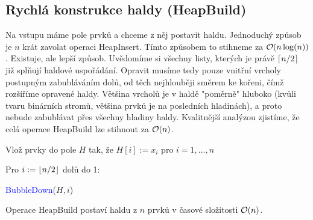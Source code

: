 \begin{center}
    
\end{center}

\bigskip

\subsection{Rychlá konstrukce haldy (HeapBuild)}

Na vstupu máme pole prvků a chceme z něj postavit haldu. Jednoduchý způsob je $n$ krát zavolat operaci HeapInsert. Tímto způsobem to stihneme za $\mathcal{O}(n\log(n))$. Existuje, ale lepší způsob. Uvědomíme si všechny listy, kterých je právě $\left\lceil n/2\right\rceil$ již splňují haldové uspořádání. Opravit musíme tedy pouze vnitřní vrcholy postupným zabubláváním dolů, od těch nejhlouběji směrem ke kořeni, čímž rozšíříme opravené haldy. Většina vrcholů je v haldě "poměrně" hluboko (kvůli tvaru binárních stromů, většina prvků je na posledních hladinách), a proto nebude zabublávat přes všechny hladiny haldy. Kvalitnější analýzou zjistíme, že celá operace HeapBuild lze stihnout za $\mathcal{O}(n)$.\bigskip

\begin{pseudocode}
\item Vlož prvky do pole $H$ tak, že $H[i] := x_i$ pro $i = 1, \dots, n$
\item Pro $i := \left\lfloor n/2\right\rfloor$ dolů do 1:
\item \tab \textcolor{blue}{BubbleDown}($H, i$)
\end{pseudocode}

\bigskip

\begin{theorem}
Operace $\text{HeapBuild}$ postaví haldu z $n$ prvků v časové složitosti $\mathcal{O}(n)$.
\end{theorem}

